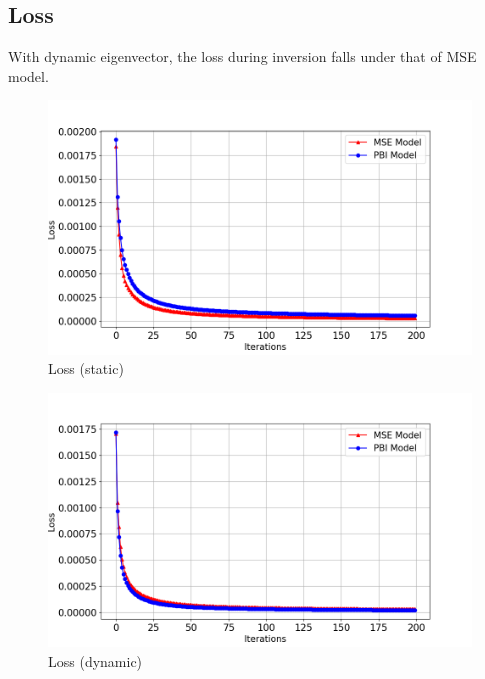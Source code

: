 \documentclass[
]{article}
\begin{document}
\subsection{Loss}\label{loss}

With dynamic eigenvector, the loss during inversion falls under that of
MSE model.

\begin{figure}[H]

{\centering \includegraphics[width=1\textwidth,height=\textheight]{../../gen_sample/GCS_partial/both_0/loss_plot_100.0_200_same_eig.png}

}

\caption{Loss (static)}

\end{figure}%
\begin{figure}[H]

{\centering \includegraphics[width=1\textwidth,height=\textheight]{../../gen_sample/GCS_partial/both_0/loss_plot_100.0_200.png}

}

\caption{Loss (dynamic)}

\end{figure}%
\end{document}

